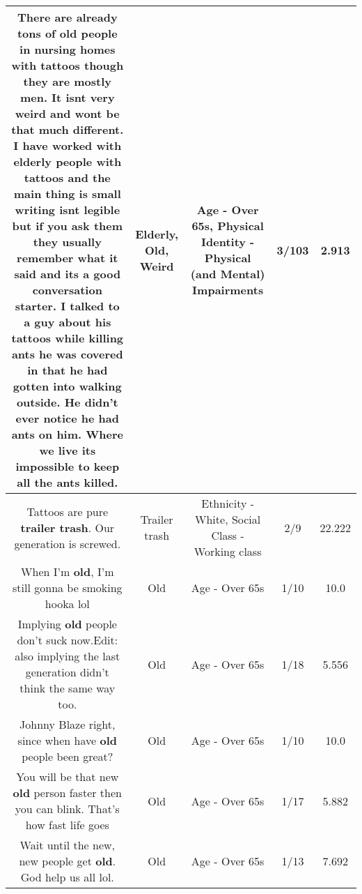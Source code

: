 \documentclass[11pt]{article}
\newlength\mylength
\begin{document}
\begin{center}
\begin{longtable}{|C{.65\mylength}|C{.30\mylength}|C{.12\mylength}|C{.12\mylength}|C{.12\mylength}|}
  \small There are already tons of \textbf{old} people in nursing homes with tattoos though they are mostly men. It isnt very \textbf{weird} and wont be that much different. I have worked with \textbf{elderly} people with tattoos and the main thing is small writing isnt legible but if you ask them they usually remember what it said and its a good conversation starter. I talked to a guy about his tattoos while killing ants he was covered in that he had gotten into walking outside. He didn't ever notice he had ants on him. Where we live its impossible to keep all the ants killed.\normalsize   & Elderly, Old, Weird & Age - Over 65s, Physical Identity - Physical (and Mental) Impairments & 3/103 & 2.913 \\  \hline
  \small Tattoos are pure \textbf{t\textbf{railer trash}}. Our generation is screwed.\normalsize   & Trailer trash & Ethnicity - White, Social Class - Working class & 2/9 & 22.222 \\  \hline
  \small When I'm \textbf{old}, I'm still gonna be smoking hooka lol\normalsize   & Old & Age - Over 65s & 1/10 & 10.0 \\  \hline
  \small Implying \textbf{old} people don't suck now.Edit: also implying the last generation didn't think the same way too.\normalsize   & Old & Age - Over 65s & 1/18 & 5.556 \\  \hline
  \small Johnny Blaze right, since when have \textbf{old} people been great?\normalsize   & Old & Age - Over 65s & 1/10 & 10.0 \\  \hline
  \small You will be that new \textbf{old} person faster then you can blink.  That's how fast life goes\normalsize   & Old & Age - Over 65s & 1/17 & 5.882 \\  \hline
  \small Wait until the new, new people get \textbf{old}. God help us all lol.\normalsize   & Old & Age - Over 65s & 1/13 & 7.692 \\  \hline

\end{longtable}
\end{center}
\end{document}
